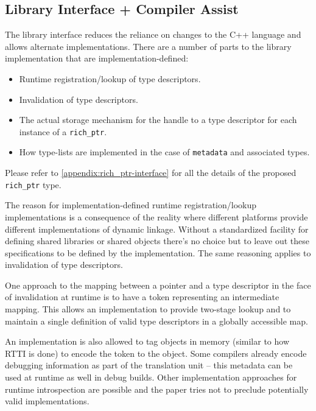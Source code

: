 \subsection{Library Interface + Compiler Assist}

The library interface reduces the reliance on changes to the C++ language and
allows alternate implementations. There are a number of parts to the library
implementation that are implementation-defined:

\begin{itemize}

 \item Runtime registration/lookup of type descriptors.

 \item Invalidation of type descriptors.

 \item The actual storage mechanism for the handle to a type descriptor for
each instance of a \verb+rich_ptr+.

 \item How type-lists are implemented in the case of \verb+metadata+ and
associated types.

\end{itemize}

Please refer to \autoref{appendix:rich_ptr-interface} for all the details of
the proposed \verb+rich_ptr+ type.

The reason for implementation-defined runtime registration/lookup
implementations is a consequence of the reality where different platforms
provide different implementations of dynamic linkage. Without a standardized
facility for defining shared libraries or shared objects there's no choice but
to leave out these specifications to be defined by the implementation. The
same reasoning applies to invalidation of type descriptors.

One approach to the mapping between a pointer and a type descriptor in the
face of invalidation at runtime is to have a token representing an
intermediate mapping. This allows an implementation to provide two-stage
lookup and to maintain a single definition of valid type descriptors in a
globally accessible map.

An implementation is also allowed to tag objects in memory (similar to how
RTTI is done) to encode the token to the object. Some compilers already encode
debugging information as part of the translation unit -- this metadata can be
used at runtime as well in debug builds. Other implementation approaches for
runtime introspection are possible and the paper tries not to preclude
potentially valid implementations.

